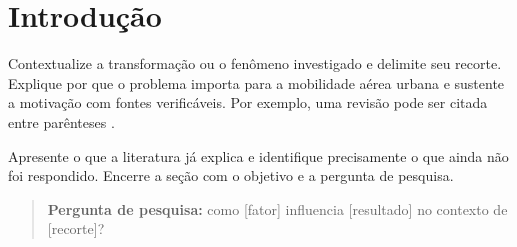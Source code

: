 \section{Introdução}
\label{sec:introducao}

Contextualize a transformação ou o fenômeno investigado e delimite seu recorte.
Explique por que o problema importa para a mobilidade aérea urbana e sustente a
motivação com fontes verificáveis. Por exemplo, uma revisão pode ser citada
entre parênteses \citep{garrow2021uam}.

Apresente o que a literatura já explica e identifique precisamente o que ainda
não foi respondido. Encerre a seção com o objetivo e a pergunta de pesquisa.

\begin{quote}
\textbf{Pergunta de pesquisa:} como [fator] influencia [resultado] no contexto
de [recorte]?
\end{quote}

